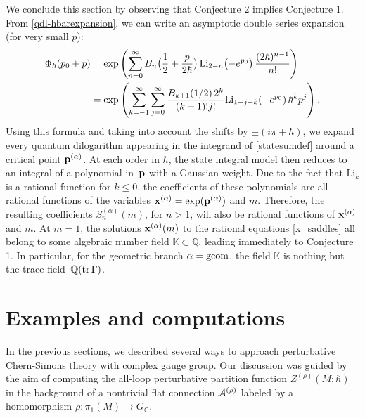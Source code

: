 \documentclass[hyper]{JHEP3}
\def\tr{{\rm tr\,}}
\def\CA {{\cal A}}
\newcommand{\C}{{\mathbb{C}}}
\begin{document}
We conclude this section by observing that Conjecture 2 implies Conjecture 1. From \eqref{qdl-hbarexpansion}, we can write an asymptotic double series expansion (for very small $p$):
%
\begin{align}
\Phi_{\hbar} (p_0 + p) &= \exp\left( \sum_{n=0}^\infty  B_n\bigl(\frac12+\frac
p{2\hbar}\bigr)\,\text{Li}_{2-n}\bigl(-e^{p_0}\bigr)
\,\frac{(2\hbar)^{n-1}}{n!}\right) \notag \\
 &= \exp \left( \sum_{k=-1}^\infty \sum_{j=0}^\infty
\frac{B_{k+1}(1/2)\,2^k}{(k+1)! j!} \text{Li}_{1-j-k} (-e^{p_0})\,\hbar^k p^j \right).
\label{qdl_exp}
\end{align}
Using this formula and taking into account the shifts by $\pm(i\pi+\hbar)$,
we expand every quantum dilogarithm appearing in
the integrand of \eqref{statesumdef} around a critical point ${\bf p}^{(\alpha)}$.
At each order in $\hbar$, the state integral model then reduces to an
integral of a polynomial in~${\bf p}$ with a Gaussian weight.
Due to the fact that $\text{Li}_k$ is a rational function for $k\le 0$,
the coefficients of these polynomials are all rational functions of
the variables ${\bf x}^{(\alpha)} = \exp ({\bf p}^{(\alpha)})$ and $m$.
Therefore, the resulting coefficients $S_n^{(\alpha)}(m)$, for $n>1$,
will also be rational functions of ${\bf x}^{(\alpha)}$ and $m$.
At $m=1$, the solutions ${\bf x}^{(\alpha)} (m)$ to the rational equations \eqref{x_saddles}
all belong to some algebraic number field $\mathbb{K} \subset \overline{\mathbb{Q}}$,
leading immediately to Conjecture 1.
In particular, for the geometric branch $\alpha = {\rm geom}$,
the field $\mathbb{K}$ is nothing but the trace field~$\mathbb{Q} (\tr \Gamma)$.


\section{Examples and computations}
\label{sec:example}

In the previous sections, we described several ways to approach perturbative
Chern-Simons theory with complex gauge group.
Our discussion was guided by the aim of computing the all-loop perturbative partition
function $Z^{(\rho)} (M;\hbar)$ in the background of a nontrivial
flat connection $\CA^{(\rho)}$ labeled by a homomorphism $\rho: \pi_1 (M) \to G_{\C}$.
\end{document}
